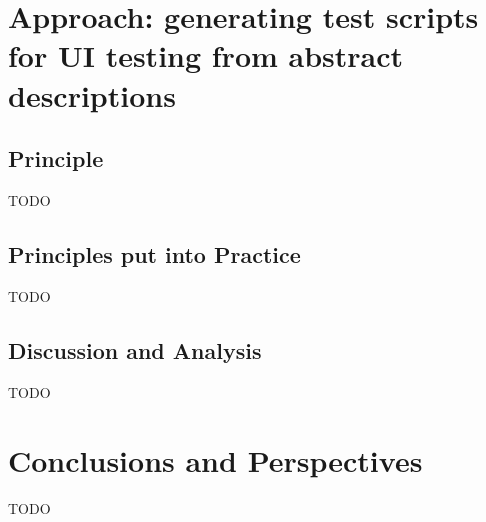 \documentclass{chi-ext}
\begin{document}
\section{Approach: generating test scripts for UI testing from abstract descriptions}
\subsection{Principle}
TODO

\subsection{Principles put into Practice}
TODO

\subsection{Discussion and Analysis}
TODO

\section{Conclusions and Perspectives}
TODO

\balance


\end{document}
